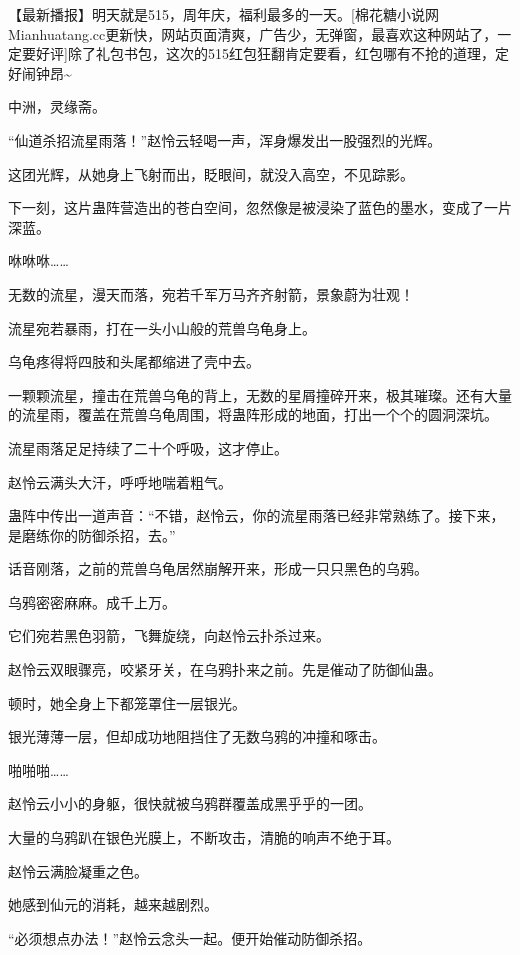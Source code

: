 
\begin{this_body}

【最新播报】明天就是515，周年庆，福利最多的一天。[棉花糖小说网Mianhuatang.cc更新快，网站页面清爽，广告少，无弹窗，最喜欢这种网站了，一定要好评]除了礼包书包，这次的515红包狂翻肯定要看，红包哪有不抢的道理，定好闹钟昂\~{}

中洲，灵缘斋。

“仙道杀招流星雨落！”赵怜云轻喝一声，浑身爆发出一股强烈的光辉。

这团光辉，从她身上飞射而出，眨眼间，就没入高空，不见踪影。

下一刻，这片蛊阵营造出的苍白空间，忽然像是被浸染了蓝色的墨水，变成了一片深蓝。

咻咻咻……

无数的流星，漫天而落，宛若千军万马齐齐射箭，景象蔚为壮观！

流星宛若暴雨，打在一头小山般的荒兽乌龟身上。

乌龟疼得将四肢和头尾都缩进了壳中去。

一颗颗流星，撞击在荒兽乌龟的背上，无数的星屑撞碎开来，极其璀璨。还有大量的流星雨，覆盖在荒兽乌龟周围，将蛊阵形成的地面，打出一个个的圆洞深坑。

流星雨落足足持续了二十个呼吸，这才停止。

赵怜云满头大汗，呼呼地喘着粗气。

蛊阵中传出一道声音：“不错，赵怜云，你的流星雨落已经非常熟练了。接下来，是磨练你的防御杀招，去。”

话音刚落，之前的荒兽乌龟居然崩解开来，形成一只只黑色的乌鸦。

乌鸦密密麻麻。成千上万。

它们宛若黑色羽箭，飞舞旋绕，向赵怜云扑杀过来。

赵怜云双眼骤亮，咬紧牙关，在乌鸦扑来之前。先是催动了防御仙蛊。

顿时，她全身上下都笼罩住一层银光。

银光薄薄一层，但却成功地阻挡住了无数乌鸦的冲撞和啄击。

啪啪啪……

赵怜云小小的身躯，很快就被乌鸦群覆盖成黑乎乎的一团。

大量的乌鸦趴在银色光膜上，不断攻击，清脆的响声不绝于耳。

赵怜云满脸凝重之色。

她感到仙元的消耗，越来越剧烈。

“必须想点办法！”赵怜云念头一起。便开始催动防御杀招。


\end{this_body}
